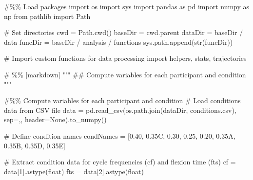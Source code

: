 \documentclass[
  11pt,
  a4paper]{article}
\newenvironment{Shaded}{\begin{snugshade}}{\end{snugshade}}
\newcommand{\BuiltInTok}[1]{\textcolor[rgb]{0.00,0.23,0.31}{#1}}
\newcommand{\CommentTok}[1]{\textcolor[rgb]{0.37,0.37,0.37}{#1}}
\newcommand{\DecValTok}[1]{\textcolor[rgb]{0.68,0.00,0.00}{#1}}
\newcommand{\ImportTok}[1]{\textcolor[rgb]{0.00,0.46,0.62}{#1}}
\newcommand{\NormalTok}[1]{\textcolor[rgb]{0.00,0.23,0.31}{#1}}
\newcommand{\OperatorTok}[1]{\textcolor[rgb]{0.37,0.37,0.37}{#1}}
\newcommand{\StringTok}[1]{\textcolor[rgb]{0.13,0.47,0.30}{#1}}
\newcommand{\VariableTok}[1]{\textcolor[rgb]{0.07,0.07,0.07}{#1}}
\begin{document}
\begin{Shaded}
\begin{Highlighting}[]
\CommentTok{\#\%\% Load packages}
\ImportTok{import}\NormalTok{ os}
\ImportTok{import}\NormalTok{ sys}
\ImportTok{import}\NormalTok{ pandas }\ImportTok{as}\NormalTok{ pd}
\ImportTok{import}\NormalTok{ numpy }\ImportTok{as}\NormalTok{ np}
\ImportTok{from}\NormalTok{ pathlib }\ImportTok{import}\NormalTok{ Path}

\CommentTok{\# Set directories}
\NormalTok{cwd }\OperatorTok{=}\NormalTok{ Path.cwd()}
\NormalTok{baseDir }\OperatorTok{=}\NormalTok{ cwd.parent}
\NormalTok{dataDir }\OperatorTok{=}\NormalTok{ baseDir }\OperatorTok{/} \StringTok{\textquotesingle{}data\textquotesingle{}}
\NormalTok{funcDir }\OperatorTok{=}\NormalTok{ baseDir }\OperatorTok{/} \StringTok{\textquotesingle{}analysis\textquotesingle{}} \OperatorTok{/} \StringTok{\textquotesingle{}functions\textquotesingle{}}
\NormalTok{sys.path.append(}\BuiltInTok{str}\NormalTok{(funcDir))}

\CommentTok{\# Import custom functions for data processing}
\ImportTok{import}\NormalTok{ helpers, stats, trajectories}

\CommentTok{\# \%\% [markdown]}
\CommentTok{"""}
\CommentTok{\#\# Compute variables for each participant and condition}
\CommentTok{"""}

\CommentTok{\#\%\% Compute variables for each participant and condition}
\CommentTok{\# Load conditions data from CSV file}
\NormalTok{data }\OperatorTok{=}\NormalTok{ pd.read\_csv(os.path.join(dataDir, }\StringTok{\textquotesingle{}conditions.csv\textquotesingle{}}\NormalTok{), sep}\OperatorTok{=}\StringTok{\textquotesingle{},\textquotesingle{}}\NormalTok{, header}\OperatorTok{=}\VariableTok{None}\NormalTok{).to\_numpy()}

\CommentTok{\# Define condition names}
\NormalTok{condNames }\OperatorTok{=}\NormalTok{ [}\StringTok{\textquotesingle{}0.40\textquotesingle{}}\NormalTok{, }\StringTok{\textquotesingle{}0.35C\textquotesingle{}}\NormalTok{, }\StringTok{\textquotesingle{}0.30\textquotesingle{}}\NormalTok{, }\StringTok{\textquotesingle{}0.25\textquotesingle{}}\NormalTok{, }\StringTok{\textquotesingle{}0.20\textquotesingle{}}\NormalTok{, }\StringTok{\textquotesingle{}0.35A\textquotesingle{}}\NormalTok{, }\StringTok{\textquotesingle{}0.35B\textquotesingle{}}\NormalTok{, }\StringTok{\textquotesingle{}0.35D\textquotesingle{}}\NormalTok{, }\StringTok{\textquotesingle{}0.35E\textquotesingle{}}\NormalTok{]}

\CommentTok{\# Extract condition data for cycle frequencies (cf) and flexion time (fts)}
\NormalTok{cf }\OperatorTok{=}\NormalTok{ data[}\DecValTok{1}\NormalTok{].astype(}\BuiltInTok{float}\NormalTok{)}
\NormalTok{fts }\OperatorTok{=}\NormalTok{ data[}\DecValTok{2}\NormalTok{].astype(}\BuiltInTok{float}\NormalTok{)}


\end{Highlighting}
\end{Shaded}
\end{document}
